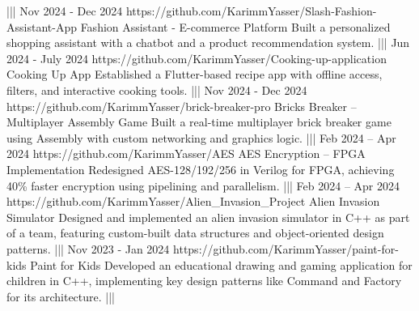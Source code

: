 {    |||
    {Nov 2024 - Dec 2024}%
    {https://github.com/KarimmYasser/Slash-Fashion-Assistant-App}%
    {Fashion Assistant - E-commerce Platform}%
    {Built a personalized shopping assistant with a chatbot and a product recommendation system.}%
    |||
    {Jun 2024 - July 2024}%
    {https://github.com/KarimmYasser/Cooking-up-application}%
    {Cooking Up App}%
    {Established a Flutter-based recipe app with offline access, filters, and interactive cooking tools.}%
    |||
    {Nov 2024 - Dec 2024}%
    {https://github.com/KarimmYasser/brick-breaker-pro}%
    {Bricks Breaker – Multiplayer Assembly Game}%
    {Built a real-time multiplayer brick breaker game using Assembly with custom networking and graphics logic.}%
    |||
    {Feb 2024 – Apr 2024}%
    {https://github.com/KarimmYasser/AES}%
    {AES Encryption – FPGA Implementation}%
    {Redesigned AES-128/192/256 in Verilog for FPGA, achieving 40\% faster encryption using pipelining and parallelism.}%
    |||
    {Feb 2024 – Apr 2024}%
    {https://github.com/KarimmYasser/Alien_Invasion_Project}%
    {Alien Invasion Simulator}%
    {Designed and implemented an alien invasion simulator in C++ as part of a team, featuring custom-built data structures and object-oriented design patterns.}%
    |||
    {Nov 2023 - Jan 2024}%
    {https://github.com/KarimmYasser/paint-for-kids}%
    {Paint for Kids}%
    {Developed an educational drawing and gaming application for children in C++, implementing key design patterns like Command and Factory for its architecture.}%
    |||%
}


\newcommand{\programmingLanguages}{Dart, Kotlin, Python, C, C++, Java, TypeScript, JavaScript, SQL, Assembly}

\newcommand{\mobileDevelopment}{Flutter, Android (Kotlin with Jetpack Compose \& XML Views), React Native}

\newcommand{\frameworksLibraries}{Bloc, Riverpod, Provider, GetX, Dagger/Hilt, Navigation Component, Scikit-learn, Pandas, NumPy, Streamlit, Selenium, Tkinter, Room, Retrofit, Firebase, RESTful APIs}

\newcommand{\backendDatabase}{Supabase, Firebase, SQLite, Room, SQL, MySQL, Database Design, API Integration}

\newcommand{\developmentTools}{Git, GitHub, Docker, Jupyter Notebooks, VS Code, Android Studio, Desktop App Development, Web Scraping, Agile}

